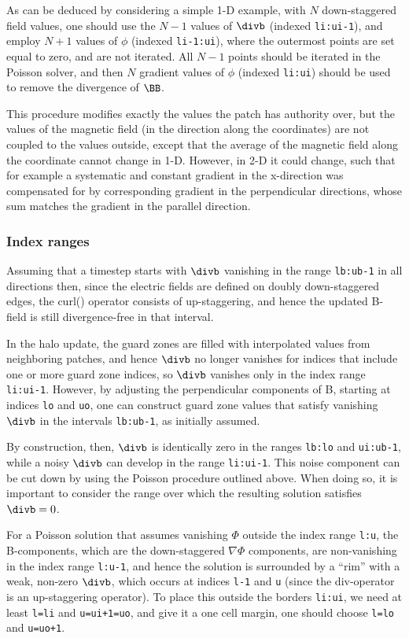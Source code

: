 \documentclass[paper=a4,fontsize=11pt]{scrartcl}
\numberwithin{equation}{section}		%
\numberwithin{figure}{section}			%
\numberwithin{table}{section}				%
\newcommand{\codecolor}{\color{Blue}}
\newcommand{\Code}[1]{{\codecolor\texttt{#1}}}
\begin{document}
As can be deduced by considering a simple 1-D example, with $N$ down-staggered field values, one should use the $N-1$ values of $\divb$ (indexed \verb|li:ui-1|), and employ $N+1$ values of $\phi$ (indexed \verb|li-1:ui|), where the outermost points are set equal to zero, and are not iterated.  All $N-1$ points should be iterated in the Poisson solver, and then $N$ gradient values of $\phi$ (indexed \Verb|li:ui|) should be used to remove the divergence of $\BB$.

This procedure modifies exactly the values the patch has authority over, but the values of the magnetic field (in the direction along the coordinates) are not coupled to the values outside, except that the average of the magnetic field along the coordinate cannot change in 1-D.  However, in 2-D it could change, such that for example a systematic and constant gradient in the x-direction was compensated for by corresponding gradient in the perpendicular directions, whose sum matches the gradient in the parallel direction.
 
\subsubsection{Index ranges}
Assuming that a timestep starts with $\divb$ vanishing in the range \Code{lb:ub-1} in all directions then, since the electric fields are defined on doubly down-staggered edges, the curl() operator consists of up-staggering, and hence the updated B-field is still divergence-free in that interval.

In the halo update, the guard zones are filled with interpolated values from neighboring patches, and hence $\divb$ no longer vanishes for indices that include one or more guard zone indices, so $\divb$ vanishes only in the index range \Code{li:ui-1}.  However, by adjusting the perpendicular components of B, starting at indices \Code{lo} and \Code{uo}, one can construct guard zone values that satisfy vanishing $\divb$ in the intervals \Code{lb:ub-1}, as initially assumed.

By construction, then, $\divb$ is identically zero in the ranges \Code{lb:lo} and \Code{ui:ub-1}, while a noisy $\divb$ can develop in the range \Code{li:ui-1}.  This noise component can be cut down by using the Poisson procedure outlined above.  When doing so, it is important to consider the range over which the resulting solution satisfies $\divb=0$.

For a Poisson solution that assumes vanishing $\Phi$ outside the index range \Code{l:u}, the B-components, which are the down-staggered $\nabla\Phi$ components, are non-vanishing in the index range \Code{l:u-1}, and hence the solution is surrounded by a ``rim'' with a weak, non-zero $\divb$, which occurs at indices \Code{l-1} and \Code{u} (since the div-operator is an up-staggering operator).  To place this outside the borders \Code{li:ui}, we need at least \Code{l=li} and \Code{u=ui+1=uo}, and give it a one cell margin, one should choose \Code{l=lo} and \Code{u=uo+1}.
\end{document}
